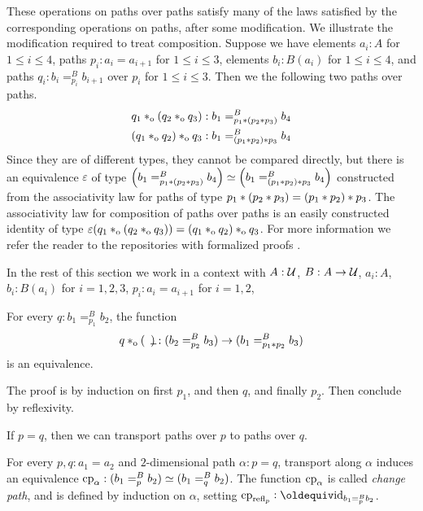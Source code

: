 \documentclass[a4paper,12pt]{amsart}
\begin{document}
These operations on paths over paths satisfy many of the laws satisfied by the corresponding operations on paths, after some modification.  We
illustrate the modification required to treat composition.  Suppose we have elements $a_i : A$ for $1 \le i \le 4$, paths $p_i : a_i = a_{i+1}$
for $1 \le i \le 3$, elements $b_i:B(a_i)$ for $1 \le i \le 4$, and paths $q_i : b_i =^B_{p_i} b_{i+1}$ over $p_i$ for $1 \le i \le 3$.
Then we the following two paths over paths.
\begin{align*}
   q_1 \mathbin{*_{\mathrm{o}}} (q_2 \mathbin{*_{\mathrm{o}}} q_3) & : b_1 =^B_{p_1* (p_2* p_3)} b_4 \\
  (q_1 \mathbin{*_{\mathrm{o}}} q_2) \mathbin{*_{\mathrm{o}}} q_3  & : b_1 =^B_{(p_1* p_2) * p_3} b_4
\end{align*}
Since they are of different types, they cannot be compared directly, but there is an
equivalence $\varepsilon$ of type $\left( b_1 =^B_{p_1* (p_2* p_3)} b_4 \right) \simeq \left( b_1 =^B_{(p_1* p_2) * p_3} b_4 \right)$
constructed from the associativity law for paths of type $p_1*(p_2* p_3) = (p_1* p_2)* p_3$.
The associativity law for composition of paths over paths is an easily constructed identity of type $\varepsilon(q_1 \mathbin{*_{\mathrm{o}}} (q_2 \mathbin{*_{\mathrm{o}}} q_3)) = (q_1 \mathbin{*_{\mathrm{o}}} q_2)\mathbin{*_{\mathrm{o}}} q_3$.
For more information we refer the reader to the repositories with formalized proofs
\cite[\href{https://github.com/UniMath/UniMath/blob/master/UniMath/SyntheticHomotopyTheory/Circle2.v}{Circle2.v}]{UniMath}.

In the rest of this section we work in a context with
$A : \mathcal{U}$, $B : A \to \mathcal{U}$, $a_i:A$, $b_i:B(a_i)$ for $i=1,2,3$,
$p_i : a_i = a_{i+1}$ for $i=1,2$,

\begin{lemma}\label{lem:compo-over}
  For every $q : b_1 =^B_{p_1} b_2$, the
  function
  \[
    q \cto ({\blank}) : (b_2 =^B_{p_2} b_3) \to (b_1 =^B_{p_1\ct p_2} b_3)
  \]
  is an equivalence.
\end{lemma}
The proof is by induction on first $p_1$, and then $q$, and finally $p_2$.
Then conclude by reflexivity.

If $p=q$, then we can transport paths over $p$ to paths over $q$.

\begin{definition}\label{def:pathover-change-path}
  For every $p,q:a_1=a_2$ and $2$-dimensional path $\alpha : p = q$,
  transport along $\alpha$
  induces an equivalence $\mathrm{cp}_{\alpha}: (b_1 =^B_p b_2) \simeq (b_1 =^B_q b_2)$.
  The function $\mathrm{cp}_{\alpha}$ is called \emph{change path}, and is defined
  by induction on $\alpha$, setting $\cp{\refl{p}}\defeq \id_{b_1 =^B_p b_2}$.
\end{definition}
\end{document}

